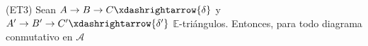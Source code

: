 \documentclass[preview]{standalone}
\begin{document}
\begin{center}
(ET3) Sean $A\to B\to C\xdashrightarrow{\delta}$ y $A'\to B'\to C'\xdashrightarrow{\delta'}$ $\mathbb{E}$-triángulos. Entonces, para todo diagrama conmutativo en $\mathscr{A}$
\end{center}
\end{document}
